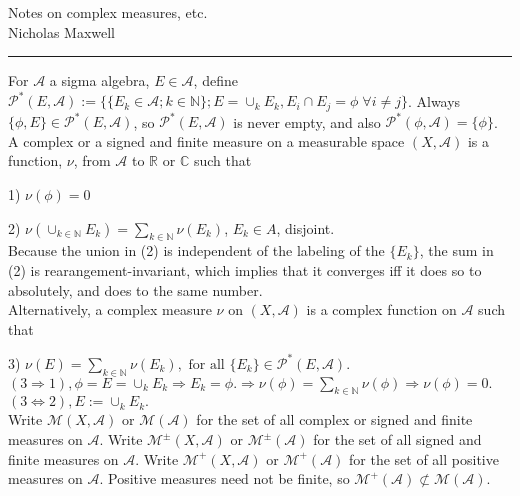 \documentclass[12pt]{article}
\newcommand{\partset}[1]{ \mathcal{P}^{*}(#1) }
\newcommand{\fall}[0] { \textrm{ for all } }
\newcommand{\nats}[0] { \mathbb{N}}
\newcommand{\reals}[0] { \mathbb{R}}
\newcommand{\cmplxs}[0] { \mathbb{C}}
\newcommand{\A}[0] { \mathcal{A} }
\newcommand{\M}[0] { \mathcal{M} }
\newcommand{\rimply}[0] { \Rightarrow }
\newcommand{\lrimply}[0] { \Leftrightarrow }
\begin{document}
\begin{flushleft}
Notes on complex measures, etc. \\
Nicholas Maxwell\\
\end{flushleft}

\begin{flushleft}
\addvspace{5pt} \hrule
\end{flushleft}	

For $\A$ a sigma algebra, $E \in \A$, define $\partset{E, \A} := \{ \{ E_k \in \A; k \in \nats \}; E = \cup_k E_k, E_i \cap E_j = \phi \;  \forall i \not = j \}$. Always $ \{ \phi, E \} \in \partset{E, \A}$, so $\partset{E, \A}$ is never empty, and also $\partset{\phi, \A} = \{ \phi \}$. \\



A complex or a signed and finite measure on a measurable space $(X,\A)$ is a function, $\nu$, from $\A$ to $\reals$ or $\cmplxs$ such that

1) $\nu(\phi) = 0$

2) $\nu( \cup_{k\in \nats} E_k ) = \sum_{k \in \nats} \nu(E_k) $, $E_k \in A$, disjoint.  \\

Because the union in (2) is independent of the labeling of the $\{ E_k \}$, the sum in (2) is rearangement-invariant, which implies that it converges iff it does so to absolutely, and does to the same number. \\

Alternatively, a complex measure $\nu$ on $(X,\A)$ is a complex function on $\A$ such that

3) $\nu(E) = \sum_{k \in \nats} \nu(E_k), \fall \{ E_k\} \in \partset{E, \A}$.\\

$(3 \rimply 1), \phi = E = \cup_k E_k \rimply E_k = \phi. \rimply \nu(\phi) = \sum_{k \in \nats } \nu(\phi) \rimply \nu(\phi) = 0.$ $(3 \lrimply 2), E := \cup_k E_k.$ \\



Write $\M(X,\A)$ or $\M(\A)$ for the set of all complex or signed and finite measures on $\A$.
Write $\M^\pm(X,\A)$ or $\M^\pm(\A)$ for the set of all signed and finite measures on $\A$.
Write $\M^+(X,\A)$ or $\M^+(\A)$ for the set of all positive measures on $\A$. 
Positive measures need not be finite, so $\M^+(\A) \not \subset \M(\A)$.
\\
\end{document}
